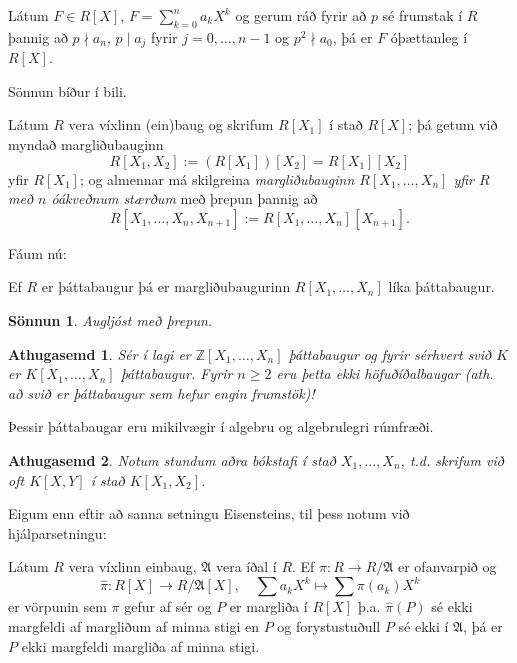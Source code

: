 \documentclass[a4paper,icelandic,11pt]{book}
\theoremstyle{plain}
\newtheorem*{ath}{Athugasemd}
\newtheorem*{sonnun}{Sönnun}
\newcommand{\Z}{\mathbb{Z}}
\DeclareMathOperator{\stig}{stig} %
\begin{document}
\begin{setn}
  [Eisenstein]
  Látum $F\in R[X]$, $F=\sum_{k=0}^n a_k X^k$ og gerum ráð fyrir að $p$ sé
  frumstak í $R$ þannig að $p\nmid a_n$, $p\mid a_j$ fyrir $j=0,\dots,n-1$ og
  $p^2 \nmid a_0$, þá er $F$ óþættanleg í $R[X]$.
\end{setn}
Sönnun bíður í bili.
\begin{skilgr}
  Látum $R$ vera víxlinn (ein)baug og skrifum $R[X_1]$ í stað $R[X]$; þá getum
  við myndað margliðubauginn \[
  R[X_1,X_2] := (R[X_1])[X_2] = R[X_1][X_2]
  \]
  yfir $R[X_1]$; og almennar má skilgreina
  \emph{margliðubauginn $R[X_1,\dots,X_n]$ yfir $R$ með $n$ óákveðnum
  stærðum}
  með þrepun þannig að \[
  R[X_1,\dots,X_n,X_{n+1}] := R[X_1,\dots,X_n][X_{n+1}].
  \]
\end{skilgr}
Fáum nú:
\begin{setn}
  Ef $R$ er þáttabaugur þá er margliðubaugurinn $R[X_1,\dots,X_n]$ líka
  þáttabaugur.
\end{setn}
\begin{sonnun}
  Augljóst með þrepun.
\end{sonnun}
\begin{ath}
  Sér í lagi er $\Z[X_1,\dots,X_n]$ þáttabaugur og fyrir sérhvert svið $K$ er
  $K[X_1,\dots,X_n]$ þáttabaugur. Fyrir $n\geq 2$ eru þetta ekki
  höfuðíðalbaugar (ath. að svið er þáttabaugur sem hefur engin frumstök)!
\end{ath}
Þessir þáttabaugar eru mikilvægir í algebru og algebrulegri rúmfræði.
\begin{ath}
  Notum stundum aðra bókstafi í stað $X_1,\dots,X_n$, t.d. skrifum við oft
  $K[X,Y]$ í stað $K[X_1,X_2]$.
\end{ath}
Eigum enn eftir að sanna setningu Eisensteins, til þess notum við
hjálparsetningu:
\begin{hjalparsetn}
  Látum $R$ vera víxlinn einbaug, $\mathfrak A$ vera íðal í $R$. Ef $\pi: R\to
  R/\mathfrak A$ er ofanvarpið og 
  \[
  \hat\pi:R[X]\to R/\mathfrak A[X],
  \quad
  \sum a_k X^k \mapsto \sum \pi(a_k)X^k
  \]
  er vörpunin sem $\pi$ gefur af sér og $P$ er margliða í $R[X]$ þ.a.
  $\hat\pi(P)$ sé ekki margfeldi af margliðum af minna stigi en $P$ og
  forystustuðull $P$ sé ekki í $\mathfrak A$, þá er $P$ ekki margfeldi
  margliða af minna stigi. 
\end{hjalparsetn}
\end{document}
